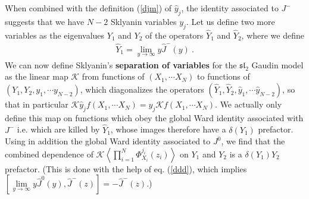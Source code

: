 \documentclass[12pt,a4paper,notitlepage]{report}
\newcommand \la {\left\langle}
\newcommand \ra {\right\rangle}
\numberwithin{equation}{section}
\theoremstyle{break}
\begin{document}
When combined with the definition (\ref{djm}) of $\hat{y}_j$, the identity associated to $J^-$ suggests that we have $N-2$ Sklyanin variables $y_j$. Let us define two more variables as the eigenvalues $Y_1$ and $Y_2$ of the operators $\hat{Y}_1$ and $\hat{Y}_2$, where we define
\begin{align}
 \hat{Y}_1 = \underset{y\rightarrow \infty}{\lim} y \hat{J}^-(y)\ .
\end{align}
We can now define Sklyanin's \textbf{\boldmath separation of variables} for the $\mathfrak{sl}_2$ Gaudin model as the linear 
map $\mathcal{K}$ from functions of $(X_1,\cdots X_N)$ to functions of $(Y_1,Y_2,y_1,\cdots y_{N-2})$, which diagonalizes the operators $(\hat{Y}_1,\hat{Y}_2,\hat{y}_1,\cdots \hat{y}_{N-2})$, so that in particular $\mathcal{K} \hat{y}_j f(X_1,\cdots X_N) = y_j \mathcal{K} f(X_1,\cdots X_N)$. We actually only define this map on 
functions which obey the global Ward identity associated with $J^-$ i.e. which are killed by $\hat{Y}_1$, whose images therefore have a $\delta(Y_1)$ prefactor. Using in addition the global Ward identity associated to $J^0$, we find that the combined dependence of $\mathcal{K}\la \prod_{i=1}^N \Phi^{j_i}_{X_i}(z_i)\ra$ on $Y_1$ and $Y_2$ is a $\delta(Y_1)Y_2$ prefactor.
(This is done with the help of eq. (\ref{ddd}), which implies $[\underset{y\rightarrow \infty}{\lim} y \hat{J}^0(y),\hat{J}^-(z)]=-\hat{J}^-(z)$.)
\end{document}
